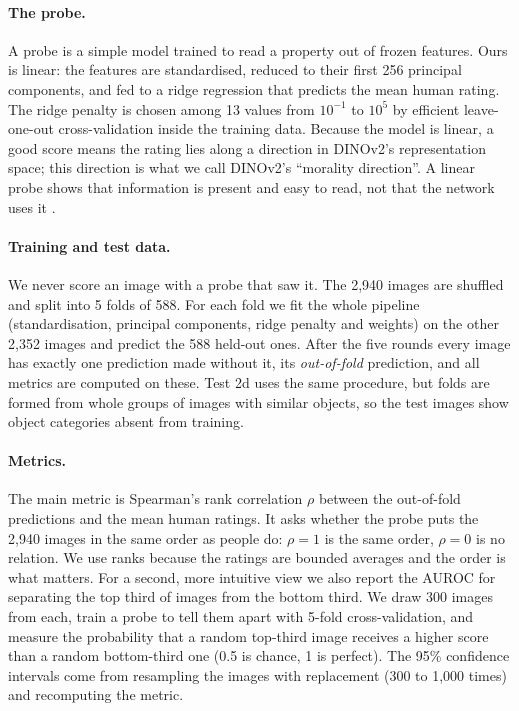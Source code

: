 \documentclass[11pt]{article}
\begin{document}
\paragraph{The probe.} A probe is a simple model trained to read a property out of frozen features. Ours is linear: the features are standardised, reduced to their first 256 principal components, and fed to a ridge regression that predicts the mean human rating. The ridge penalty is chosen among 13 values from $10^{-1}$ to $10^{5}$ by efficient leave-one-out cross-validation inside the training data. Because the model is linear, a good score means the rating lies along a direction in DINOv2's representation space; this direction is what we call DINOv2's ``morality direction''. A linear probe shows that information is present and easy to read, not that the network uses it \cite{alain2016,belinkov2022}.

\paragraph{Training and test data.} We never score an image with a probe that saw it. The 2,940 images are shuffled and split into 5 folds of 588. For each fold we fit the whole pipeline (standardisation, principal components, ridge penalty and weights) on the other 2,352 images and predict the 588 held-out ones. After the five rounds every image has exactly one prediction made without it, its \emph{out-of-fold} prediction, and all metrics are computed on these. Test 2d uses the same procedure, but folds are formed from whole groups of images with similar objects, so the test images show object categories absent from training.

\paragraph{Metrics.} The main metric is Spearman's rank correlation $\rho$ between the out-of-fold predictions and the mean human ratings. It asks whether the probe puts the 2,940 images in the same order as people do: $\rho=1$ is the same order, $\rho=0$ is no relation. We use ranks because the ratings are bounded averages and the order is what matters. For a second, more intuitive view we also report the AUROC for separating the top third of images from the bottom third. We draw 300 images from each, train a probe to tell them apart with 5-fold cross-validation, and measure the probability that a random top-third image receives a higher score than a random bottom-third one (0.5 is chance, 1 is perfect). The 95\% confidence intervals come from resampling the images with replacement (300 to 1,000 times) and recomputing the metric.
\end{document}
